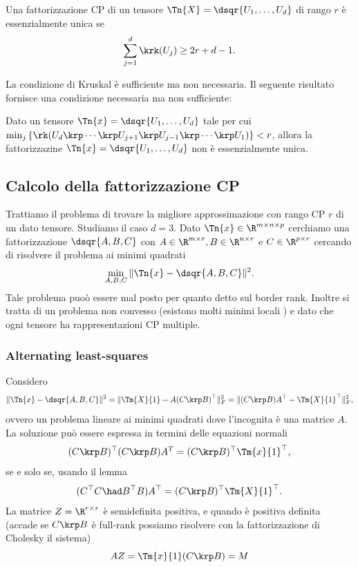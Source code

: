 \begin{theorem}
  Una fattorizzazione CP di un tensore $ \Tn{X} = \dsqr{U_1, \ldots, U_d}$ di rango $ r $ è essenzialmente unica se
  \begin{equation*}
    \sum_{j=1}^d \krk(U_j) \ge 2r + d -1.
  \end{equation*}
\end{theorem}

La condizione di Kruskal è sufficiente ma non necessaria. Il seguente risultato fornisce una
condizione necessaria ma non sufficiente:

\begin{theorem}
  Dato un tensore $ \Tn{x} = \dsqr{U_1, \ldots, U_d}$ tale per cui $ \min_j \left\{ \rk(U_d \krp
  \cdots \krp U_{j+1} \krp U_{j-1} \krp \cdots \krp U_1) \right\} < r$, allora la fattorizzazine $ \Tn{x} =
  \dsqr{U_1, \ldots, U_d} $ non è essenzialmente unica.
\end{theorem}

\subsection{Calcolo della fattorizzazione CP}

Trattiamo il problema di trovare la migliore approssimazione con rango CP $ r $ di un dato tensore.
Studiamo il caso $ d = 3 $.
Dato $ \Tn{x} \in \R ^ {m \times n \times p} $ cerchiamo una fattorizzazione $ \dsqr{A, B, C} $ con
$ A \in \R^{m \times r}, B \in \R^{n\times r} $ e $ C \in \R^{p \times r} $ cercando di risolvere il
problema ai minimi quadrati
\begin{equation}
  \min_{A,B,C}\| \Tn{x} - \dsqr{A,B,C}\|^2.
\end{equation}
Tale problema puoò essere mal posto per quanto detto sul border rank. Inoltre si tratta di un
problema non convesso (esistono molti minimi locali ) e dato che ogni tensore ha
rappresentazioni CP multiple.

\subsubsection{Alternating least-squares}

Considero 
\[
\| \Tn{x} - \dsqr{A,B,C}\|^2 = \| \Tm{X}{1} - A(C \krp B)^{\top}\|_F^2 = \| (C \krp B)A^{\top} -
\Tm{X}{1}^{\top}\|_F^2
,\] 
ovvero un problema lineare ai minimi quadrati dove l'incognita è una matrice $ A $.
La soluzione può essere espressa  in termini delle equazioni normali
\[
  (C \krp B)^{\top}(C \krp B)A^T = (C \krp B)^{\top}\Tm{x}{1}^{\top}
,\] 
se e solo se, usando il lemma 
\[
  (C^{\top}C \had B^{\top}B)A^{\top} = (C \krp B)^{\top}\Tm{X}{1}^{\top}
.\] 
La matrice $ Z = \R^{r\times r} $ è semidefinita positiva, e quando è positiva definita (accade se
$ C \krp B $ è full-rank possiamo risolvere con la fattorizzazione di Cholesky il sistema)
\begin{equation}
  AZ = \Tm{x}{1}(C\krp B)= M
\end{equation}


